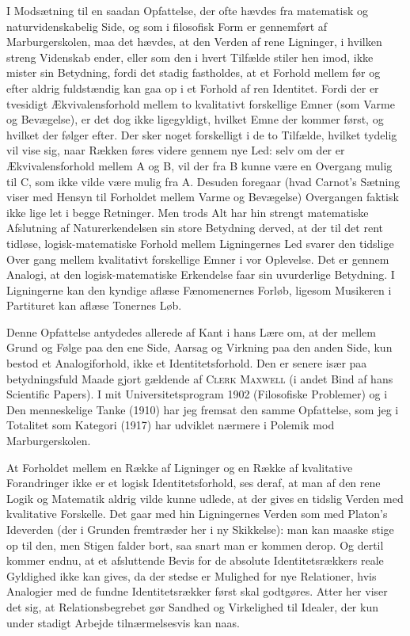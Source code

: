 \documentclass[12pt]{article}
\newcommand{\opage}[1]{\marginnote{\footnotesize\textit{[#1]}}}
\begin{document}
I Modsætning til en saadan Opfattelse, der ofte hævdes fra matematisk og
naturvidenskabelig Side, og som i filosofisk Form er gennemført af
Marburgerskolen, maa det hævdes, at den Verden af rene Ligninger, i
hvilken streng Videnskab ender, eller som den i hvert Tilfælde stiler hen
imod, ikke mister sin Betydning, fordi det stadig fastholdes, at et
Forhold mellem før og efter aldrig fuldstændig kan gaa op i et Forhold af
ren Identitet. Fordi der er tvesidigt Ækvivalensforhold mellem to
kvalitativt forskellige Emner (som Varme og Bevægelse), er det dog ikke
ligegyldigt, hvilket Emne der kommer først, og hvilket der følger efter.
Der sker noget forskelligt i de to Tilfælde, hvilket tydelig vil vise
sig, naar Rækken føres videre gennem nye Led: selv om der er
Ækvivalensforhold mellem A og B, vil der fra B kunne være en Overgang
mulig til C, som ikke vilde være mulig fra A. Desuden foregaar (hvad
Carnot's Sætning viser med Hensyn til Forholdet mellem Varme og
Bevægelse) Overgangen faktisk ikke lige let i begge Retninger. Men trods
Alt har hin strengt matematiske Afslutning af Naturerkendelsen sin store
Betydning derved, at der til det rent tidløse, logisk-matematiske Forhold
mellem Ligningernes Led svarer den tidslige Over%
\opage{52}gang mellem kvalitativt forskellige Emner i vor Oplevelse. Det er gennem
Analogi, at den logisk-matematiske Erkendelse faar sin uvurderlige
Betydning. I Ligningerne kan den kyndige aflæse Fænomenernes Forløb,
ligesom Musikeren i Partituret kan aflæse Tonernes Løb.

Denne Opfattelse antydedes allerede af Kant i hans Lære om, at der mellem
Grund og Følge paa den ene Side, Aarsag og Virkning paa den anden Side,
kun bestod et Analogiforhold, ikke et Identitetsforhold. Den er senere
især paa betydningsfuld Maade gjort gældende af \textsc{Clerk Maxwell} (i
andet Bind af hans \guillemotright Scientific Papers\guillemotleft ). I
mit Universitetsprogram 1902 (\guillemotright Filosofiske
Problemer\guillemotleft ) og i \guillemotright Den menneskelige
Tanke\guillemotleft{} (1910) har jeg fremsat den samme Opfattelse, som
jeg i \guillemotright Totalitet som Kategori\guillemotleft{} (1917) har
udviklet nærmere i Polemik mod Marburgerskolen.

At Forholdet mellem en Række af Ligninger og en Række af kvalitative
Forandringer ikke er et logisk Identitetsforhold, ses deraf, at man af
den rene Logik og Matematik aldrig vilde kunne udlede, at der gives en
tidslig Verden med kvalitative Forskelle. Det gaar med hin Ligningernes
Verden som med Platon's Ideverden (der i Grunden fremtræder her i ny
Skikkelse): man kan maaske stige op til den, men Stigen falder bort, saa
snart man er kommen derop. Og dertil kommer endnu, at et afsluttende
Bevis for de absolute Identitetsrækkers reale Gyldighed ikke kan gives,
da der stedse er Mulighed for nye Relationer, hvis Analogier med de
fundne Identitetsrækker først skal godtgøres. Atter her viser det sig, at
Relationsbegrebet gør Sandhed og Virkelighed til Idealer, der kun under
stadigt Arbejde tilnærmelsesvis kan naas.
\end{document}
